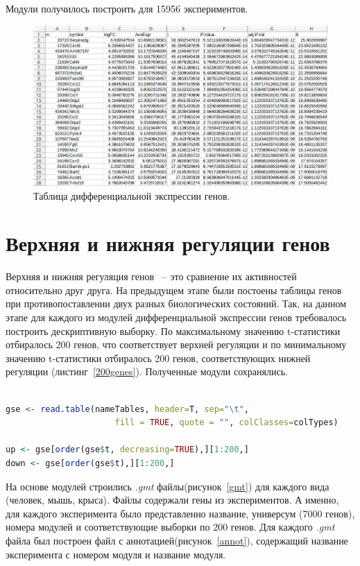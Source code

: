 \documentclass[times,specification,annotation]{itmo-student-thesis}
\begin{document}
Модули получилось построить для 15956 экспериментов.

\begin{figure}[!h]
    \caption{Таблица дифференциальной экспрессии генов.}\label{difExprs}
    \centering
    \includegraphics[width=1\textwidth]{difExprs.jpg}
\end{figure}

\section{Верхняя и нижняя регуляции генов}

Верхняя и нижняя регуляция генов ~-- это сравнение их активностей относительно друг друга. На предыдущем этапе были постоены таблицы генов при противопоставлении двух разных биологических состояний. Так, на данном этапе для каждого из модулей дифференциальной экспрессии генов требовалось построить дескриптивную выборку. По максимальному значению t-статистики отбиралось 200 генов, что соответствует верхней регуляции и по минимальному значению t-статистики отбиралось 200 генов, соответствующих нижней регуляции (листинг~\ref{200genes}). Полученные модули сохранялись. 

\begin{lstlisting}[float=!h, caption={Получение модулей по 200 генов.}, captionpos=b, label={200genes}, basicstyle=\footnotesize, language=R]

gse <- read.table(nameTables, header=T, sep="\t", 
                      fill = TRUE, quote = "", colClasses=colTypes)

up <- gse[order(gse$t, decreasing=TRUE),][1:200,]
down <- gse[order(gse$t),][1:200,]

\end{lstlisting} 

На основе модулей строились \textit{.gmt} файлы(рисунок~\ref{gmt}) для каждого вида (человек, мышь, крыса). Файлы содержали гены из экспериментов. А именно, для каждого эксперимента было представленно название, универсум (7000 генов), номера модулей и соответствующие выборки по 200 генов. Для каждого \textit{.gmt} файла был построен файл с аннотацией(рисунок~\ref{annot}), содержащий название эксперимента с номером модуля и название модуля.
\end{document}
